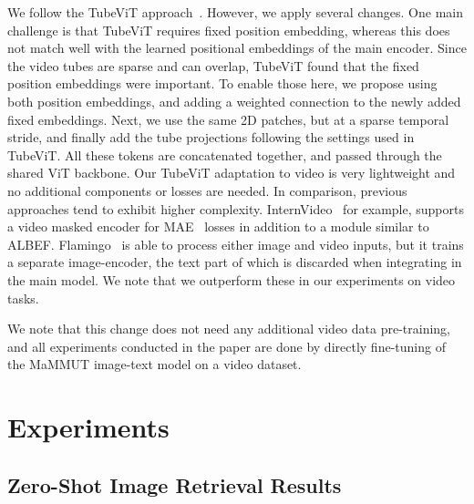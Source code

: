\documentclass[10pt]{article} \usepackage[accepted]{tmlr}
\newcommand{\ours}{MaMMUT\xspace}
\begin{document}
We follow the TubeViT approach~\citep{piergiovanni2022tubevit}. However, we apply several changes.
One main challenge is that TubeViT  requires fixed position embedding, whereas this does not match well with the learned positional embeddings of the main encoder. Since the video tubes are sparse and can overlap, TubeViT found that the fixed position embeddings were important. To enable those here, we propose using both position embeddings, and adding a weighted connection to the newly added fixed embeddings. Next, we use the same 2D patches, but at a sparse temporal stride, and finally add the tube projections following the settings used in TubeViT. All these tokens are concatenated together, and passed through the shared ViT backbone.
Our TubeViT adaptation to video is very lightweight and no additional components or losses are needed.
In comparison, previous approaches tend to exhibit higher complexity. InternVideo~\citep{internvideo} for example, supports a video masked encoder for MAE~\citep{He_2022_CVPR} losses in addition to a module similar to ALBEF. Flamingo~\citep{flamingo} is able to process either image and video inputs, but it trains a separate image-encoder, the text part of which is discarded when integrating in the main model. We note that we outperform these in our experiments on video tasks.


We note that this change does not need any additional video data pre-training, and all experiments conducted in the paper are done by directly fine-tuning of the \ours image-text model on a video dataset. 



























\vspace{-2mm}
\section{Experiments}
\vspace{-2mm}



\subsection{Zero-Shot Image Retrieval Results}
\vspace{-0.2cm}
\end{document}
